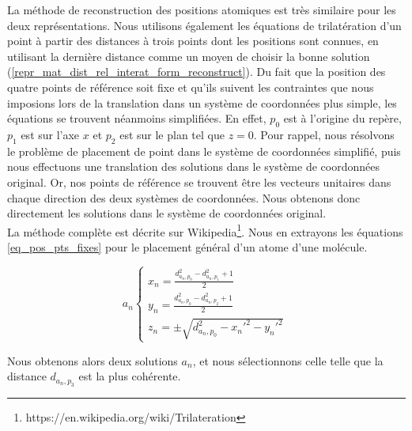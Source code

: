 \par La méthode de reconstruction des positions atomiques est très similaire pour les deux représentations. Nous utilisons également les équations de trilatération d'un point à partir des distances à trois points dont les positions sont connues, en utilisant la dernière distance comme un moyen de choisir la bonne solution (\ref{repr_mat_dist_rel_interat_form_reconstruct}). Du fait que la position des quatre points de référence soit fixe et qu'ils suivent les contraintes que nous imposions lors de la translation dans un système de coordonnées plus simple, les équations se trouvent néanmoins simplifiées. En effet, $p_0$ est à l'origine du repère, $p_1$ est sur l'axe $x$ et $p_2$ est sur le plan tel que $z=0$. Pour rappel, nous résolvons le problème de placement de point dans le système de coordonnées simplifié, puis nous effectuons une translation des solutions dans le système de coordonnées original. Or, nos points de référence se trouvent être les vecteurs unitaires dans chaque direction des deux systèmes de coordonnées. Nous obtenons donc directement les solutions dans le système de coordonnées original. \\
La méthode complète est décrite sur Wikipedia\footnote{https://en.wikipedia.org/wiki/Trilateration}. Nous en extrayons les équations \eqref{eq_pos_pts_fixes} pour le placement général d'un atome d'une molécule.


\begin{equation}
a_{n}\left \{
   	\begin{array}{l}
      x_{n}= \frac{d_{a_{n},p_{0}}^2 - d_{a_{n},p_{1}}^2 + 1}{2}\\
      y_{n}= \frac{d_{a_{n},p_{0}}^2 - d_{a_{n},p_{2}}^2 + 1}{2}\\
	  z_{n}= \pm\sqrt{d_{a_{n},p_{0}}^2 - x_{n}'^2 - y_{n}'^2}
   	\end{array}
   	\right .
   	\:
   	\label{eq_pos_pts_fixes}
\end{equation}

\vspace{0.4cm}

Nous obtenons alors deux solutions $a_n$, et nous sélectionnons celle telle que la distance $d_{a_{n},p_{3}}$ est la plus cohérente.